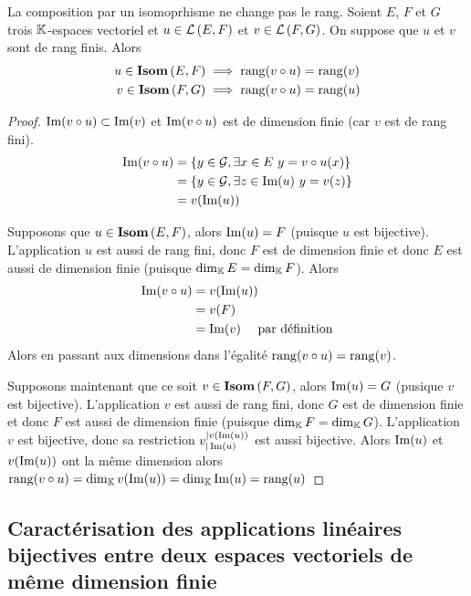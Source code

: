 \begin{theo}
  La composition par un isomoprhisme ne change pas le rang. Soient $E$, $F$ et $G$ trois $\mathbb{K}$-espaces vectoriel et $u \in \mathcal{L}\left(E,F\right)$ et $v\in \mathcal{L}\left(F,G\right)$. On suppose que $u$ et $v$ sont de rang finis. Alors
  \begin{align}
    u \in \mathbf{Isom}\left(E,F\right) &\implies \operatorname{rang}(v \circ u)=\operatorname{rang}(v) \\
    v \in \mathbf{Isom}\left(F,G\right) &\implies \operatorname{rang}(v \circ u)=\operatorname{rang}(u)
  \end{align}
\end{theo}
\begin{proof}
  $\operatorname{Im}(v \circ u) \subset \operatorname{Im}(v)$ et $\operatorname{Im}(v \circ u)$ est de dimension finie (car $v$ est de rang fini).
  \begin{align}
    \operatorname{Im}(v \circ u) &= \{y \in \mathcal{G}, \exists x \in E \ y=v \circ u(x) \}\\
    &=\{y \in \mathcal{G}, \exists z \in \operatorname{Im}(u) \ y=v(z)\}\\
    &=v(\operatorname{Im}(u))
  \end{align}

  Supposons que $u \in \mathbf{Isom}\left(E,F\right)$, alors $\operatorname{Im}(u) = F$ (puisque $u$ est bijective). L'application $u$ est aussi de rang fini, donc $F$ est de dimension finie et donc $E$ est aussi de dimension finie (puisque $\operatorname{dim}_{\mathbb{K}} E = \operatorname{dim}_{\mathbb{K}} F$). Alors
  \begin{align}
    \operatorname{Im}(v \circ u) &= v(\operatorname{Im}(u)) \\
    &=v(F) \\
    &=\operatorname{Im}(v) \quad \text{~par définition}
  \end{align}
  Alors en passant aux dimensions dans l'égalité $\operatorname{rang}(v \circ u) = \operatorname{rang}(v)$.

  Supposons maintenant que ce soit $v \in \mathbf{Isom}\left(F,G\right)$, alors $\operatorname{Im}(u) = G$ (pusique $v$ est bijective).  L'application $v$ est aussi de rang fini, donc $G$ est de dimension finie et donc $F$ est aussi de dimension finie (puisque $\operatorname{dim}_{\mathbb{K}} F = \operatorname{dim}_{\mathbb{K}} G$). L'application $v$ est bijective, donc sa restriction $v_{|\operatorname{Im}(u)}^{|v(\operatorname{Im}(u))}$ est aussi bijective. Alors $\operatorname{Im}(u)$ et $v(\operatorname{Im}(u))$ ont la même dimension alors $\operatorname{rang}(v \circ u) =\operatorname{dim}_{\mathbb{K}} v(\operatorname{Im}(u))= \operatorname{dim}_{\mathbb{K}} \operatorname{Im}(u) = \operatorname{rang}(u)$
\end{proof}

\subsection[Caractérisation des applications linéaires bijectives]{Caractérisation des applications linéaires bijectives entre deux espaces vectoriels de même dimension finie}

